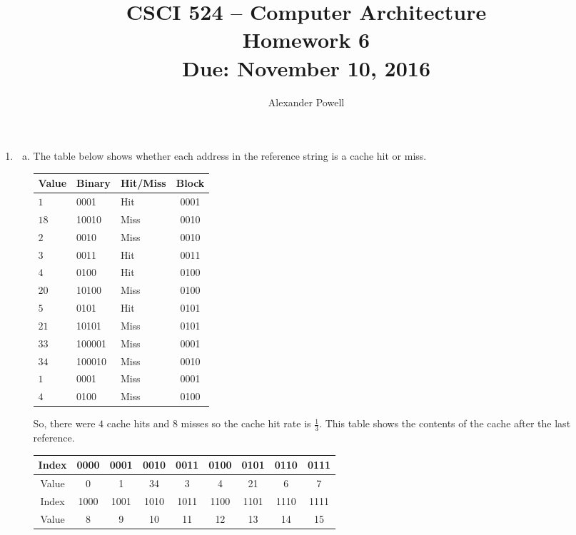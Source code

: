 \documentclass[10pt]{article} %
\title{CSCI 524 -- Computer Architecture \\
Homework 6 \\
{\large{\bf Due: November 10, 2016}}}
\date{}
\author{Alexander Powell}
\begin{document}
\maketitle
\begin{enumerate}

\item %

\begin{enumerate}[a)]
\item %

The table below shows whether each address in the reference string is a cache hit or miss.  

\begin{center}
\begin{tabular}{| l | l | l | c |}
\hline 
Value & Binary & Hit/Miss & Block \\
\hline 
$1$ & 0001 & Hit & 0001 \\
$18$ & 10010 & Miss & 0010 \\
$2$ & 0010 & Miss & 0010 \\
$3$ & 0011 & Hit & 0011 \\
$4$ & 0100 & Hit & 0100 \\
$20$ & 10100 & Miss & 0100 \\
$5$ & 0101 & Hit & 0101 \\
$21$ & 10101 & Miss & 0101 \\
$33$ & 100001 & Miss & 0001 \\
$34$ & 100010 & Miss & 0010 \\
$1$ & 0001 & Miss & 0001 \\
$4$ & 0100 & Miss & 0100 \\
\hline 
\end{tabular}
\end{center}

So, there were $4$ cache hits and $8$ misses so the cache hit rate is $\frac{1}{3}$.  
This table shows the contents of the cache after the last reference.  

\begin{center}
\begin{tabular}{| c | c | c | c | c | c | c | c | c |}
\hline
Index & 0000 & 0001 & 0010 & 0011 & 0100 & 0101 & 0110 & 0111 \\
\hline
Value & 0    & 1    & 34   & 3    & 4    & 21   & 6    & 7    \\
\hline
Index & 1000 & 1001 & 1010 & 1011 & 1100 & 1101 & 1110 & 1111 \\
\hline
Value & 8    & 9    & 10   & 11   & 12   & 13   & 14   & 15   \\
\hline
\end{tabular}
\end{center}


\end{enumerate}
\end{enumerate}
\end{document}
